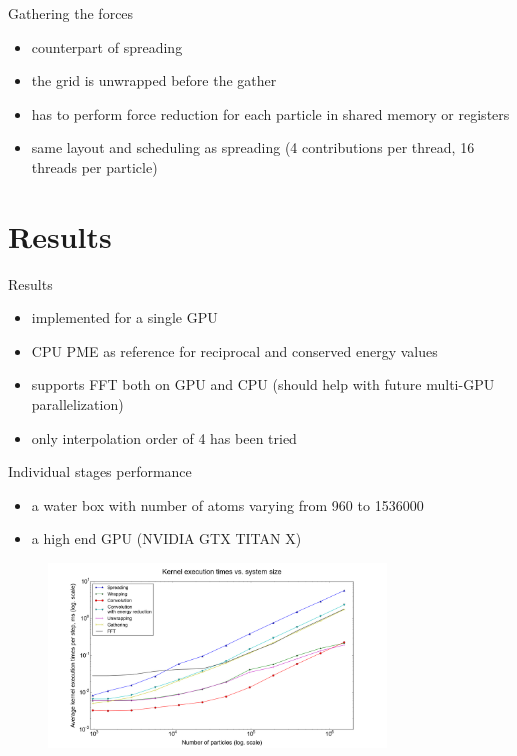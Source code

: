 \documentclass[11pt]{beamer}
\begin{document}
\begin{frame}{Gathering the forces}
\begin{itemize}
\item counterpart of spreading
\item the grid is unwrapped before the gather
\item has to perform force reduction for each particle in shared memory or registers
\item same layout and scheduling as spreading (4 contributions per thread, 16 threads per particle)
\end{itemize}
\end{frame}

\section{Results}
\begin{frame}{Results}
\begin{itemize}
\item implemented for a single GPU
\item CPU PME as reference for reciprocal and conserved energy values
\item supports FFT both on GPU and CPU (should help with future multi-GPU parallelization) 
\item only interpolation order of 4 has been tried
\end{itemize}
\end{frame}

\begin{frame}{Individual stages performance}
\begin{itemize}
\item a water box with number of atoms varying from 960 to 1536000
\item a high end GPU (NVIDIA GTX TITAN X) 
\end{itemize}
\begin{figure}
    \includegraphics[width=0.8\textwidth]{pics/kernels-noconcur-2.png}
    \label{fig:kernels}
\end{figure}
\end{frame}
\end{document}
